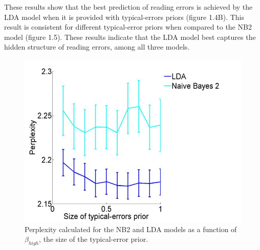 {{These results show that the best prediction of reading errors is achieved by the LDA model when it is provided with typical-errors priors (figure 1.4B). This result is consistent for different typical-error priors when compared to the NB2 model (figure 1.5). These results indicate that the LDA model best captures the hidden structure of reading errors, among all three models.

\begin{figure}[H]
\vspace{.3in}
\includegraphics[width=\linewidth]{Figures/Ch1/figure5C.jpg}
\vspace{.3in}
\caption{Perplexity calculated for the NB2 and LDA models as a function of $\beta_{high}$, the size of the typical-error prior.}
\end{figure}

}}
